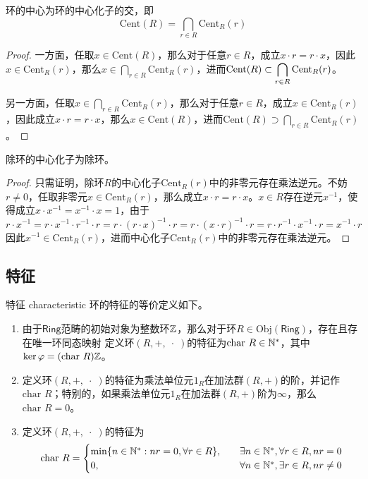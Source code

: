 \begin{proposition}
	环的中心为环的中心化子的交，即
	$$
	\mathrm{Cent}(R)=\bigcap_{r\in R}\mathrm{Cent}_R(r)
	$$
\end{proposition}

\begin{proof}
	一方面，任取$x\in\mathrm{Cent}(R)$，那么对于任意$r\in R$，成立$x\cdot r=r\cdot x$，因此$x\in \mathrm{Cent}_R(r)$，那么$\displaystyle x\in\bigcap_{r\in R}\mathrm{Cent}_R(r)$，进而$\displaystyle \mathrm{Cent}(R)\subset\bigcap_{r\in R}\mathrm{Cent}_R(r)$。
	
	另一方面，任取$\displaystyle x\in\bigcap_{r\in R}\mathrm{Cent}_R(r)$，那么对于任意$r\in R$，成立$x\in\mathrm{Cent}_R(r)$，因此成立$x\cdot r=r\cdot x$，那么$x\in\mathrm{Cent}(R)$，进而$\displaystyle \mathrm{Cent}(R)\supset\bigcap_{r\in R}\mathrm{Cent}_R(r)$。
\end{proof}

\begin{proposition}
	除环的中心化子为除环。
\end{proposition}

\begin{proof}
	只需证明，除环$R$的中心化子$\mathrm{Cent}_R(r)$中的非零元存在乘法逆元。不妨$r\ne0$，任取非零元$x\in\mathrm{Cent}_R(r)$，那么成立$x\cdot r=r\cdot x$。$x\in R$存在逆元$x^{-1}$，使得成立$x\cdot x^{-1}=x^{-1}\cdot x=1$，由于
	$$
	r\cdot x^{-1}=r\cdot x^{-1}\cdot r^{-1}\cdot r=r\cdot (r\cdot x)^{-1}\cdot r=r\cdot (x\cdot r)^{-1}\cdot r=r\cdot r^{-1}\cdot x^{-1}\cdot r=x^{-1}\cdot r
	$$
	因此$x^{-1}\in\mathrm{Cent}_R(r)$，进而中心化子$\mathrm{Cent}_R(r)$中的非零元存在乘法逆元。
\end{proof}

\subsection{特征}

\begin{definition}{特征 characteristic}
	环的特征的等价定义如下。
	\begin{enumerate}
		\item 由于$\mathsf{Ring}$范畴的初始对象为整数环$\mathbb{Z}$，那么对于环$R\in \mathrm{Obj}(\mathsf{Ring})$，存在且存在唯一环同态映射
		定义环$(R,+,\;\cdot\;)$的特征为$\text{char }R\in \mathbb{N}^*$，其中$\ker\varphi=(\text{char }R)\mathbb{Z}$。
		\item 定义环$(R,+,\;\cdot\;)$的特征为乘法单位元$1_R$在加法群$(R,+)$的阶，并记作$\text{char }R$；特别的，如果乘法单位元$1_R$在加法群$(R,+)$阶为$\infty$，那么$\text{char }R=0$。
		\item 定义环$(R,+,\;\cdot\;)$的特征为
		$$
		\text{char }R=\begin{cases}
			\min\{ n\in\mathbb{N}^*:nr=0,\forall r\in R \},\quad & \exists n\in\mathbb{N}^*,\forall r\in R,nr=0\\
			0,\quad & \forall n\in\mathbb{N}^*,\exists r\in R,nr\ne0
		\end{cases}
		$$
	\end{enumerate}
\end{definition}

